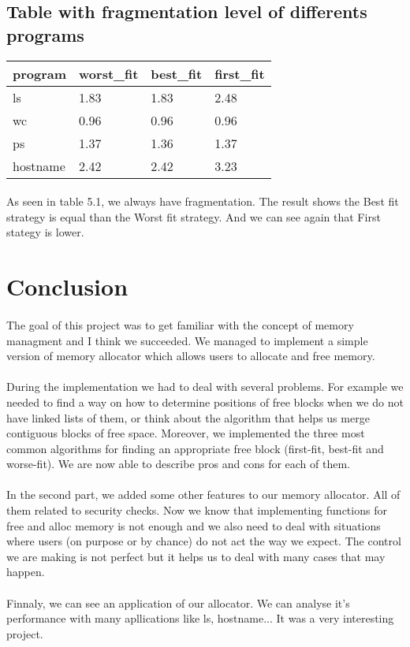 \documentclass[a4paper,10pt]{article}
\begin{document}
\subsection{Table with fragmentation level of differents programs}

\begin{tabular}{|R{2cm}|C{1.5cm}|L{1.5cm}|L{1.5cm}|}
\hline {}program & worst\_fit & best\_fit & first\_fit \\
\hline  ls & 1.83 & 1.83 & 2.48 \\
\hline  wc & 0.96 & 0.96 & 0.96 \\
\hline  ps & 1.37 & 1.36 & 1.37 \\
\hline  hostname & 2.42 & 2.42 & 3.23 \\
\hline 
\end{tabular}

\paragraph{}
As seen in table 5.1, we always have fragmentation. The result shows 
the Best fit strategy is equal than the Worst fit strategy. And we can
see again that First stategy is lower.


\section{Conclusion}
\paragraph{}
The goal of this project was to get familiar with the concept of memory 
managment and I think we succeeded. We managed to implement a simple 
version of memory allocator which allows users to allocate and free memory.
\paragraph{} 
During the implementation we had to deal with several problems. For 
example we needed to find a way on how to determine positions of free 
blocks when we do not have linked lists of them, or think about the 
algorithm that helps us merge contiguous blocks of free space. Moreover, 
we implemented the three most common algorithms for finding an appropriate 
free block (first-fit, best-fit and worse-fit). We are now able to describe 
pros and cons for each of them.
\paragraph{}
In the second part, we added some other features to our memory allocator. 
All of them related to security checks. Now we know that implementing 
functions for free and alloc memory is not enough and we also need 
to deal with situations where users (on purpose or by chance) do not act the 
way we expect. The control we are making is not perfect but it helps 
us to deal with many cases that may happen.

\paragraph{}
Finnaly, we can see an application of our allocator. We can analyse it's
performance with many apllications like ls, hostname... It was a very 
interesting project.

 
\end{document}
